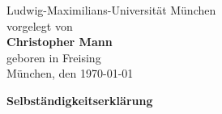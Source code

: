 \documentclass[11pt,a4paper,twoside]{article}
\begin{document}
\begin{titlepage}
\begin{center}
\hspace*{-0.73cm}
\hspace*{-0.5cm}Ludwig-Maximilians-Universität München\\
\vspace*{3.5cm}
\large
\hspace*{-0.73cm}
\hspace*{-0.8cm} vorgelegt von\\
\vspace*{0.1cm}
\hspace*{-0.73cm}
\hspace*{-0.7cm}\Large \textbf{Christopher Mann}\\
\vspace*{0.15cm}
\large
\hspace*{-0.73cm}
\hspace*{-0.8cm} geboren in Freising\\
\vspace*{2.5cm}
\vspace*{0.4cm}
\hspace*{-0.73cm}
\hspace*{-0.43cm}München, den \myformat\today\\
\end{center}
\end{titlepage}


%
%
\clearpage{\pagestyle{empty}\cleardoublepage}
%



\cleardoublepage

\pagestyle{plain}
\setcounter{page}{1}

\tableofcontents
\cleardoublepage






\cleardoublepage

{}


%


\clearpage{\pagestyle{empty}\cleardoublepage}
\thispagestyle{empty}

\vspace*{1cm}
{\huge \textbf{Selbständigkeitserklärung}}\\
\vspace*{1.5cm}
\end{document}
